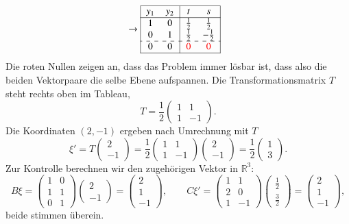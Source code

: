\begin{beispiel}
\begin{align*}
&\rightarrow
\begin{tabular}{|>{$}c<{$}>{$}c<{$}|>{$}c<{$}>{$}c<{$}|}
\hline
y_1&y_2&t&s\\
\hline
1& 0& \frac12& \frac12\\
0& 1& \frac12&-\frac12\\
\hdashline
0& 0&\color{red}0&\color{red}0\\
\hline
\end{tabular}
\end{align*}
Die {\color{red}roten} Nullen zeigen an, dass das Problem immer lösbar
ist, dass also die beiden Vektorpaare die selbe Ebene aufspannen.
Die Transformationsmatrix $T$ steht rechts oben im Tableau,
\[
T=
\frac12\begin{pmatrix} 1&1\\1&-1 \end{pmatrix}.
\]
Die Koordinaten $(2,-1)$ ergeben nach Umrechnung mit $T$
\[
\xi'=
T\begin{pmatrix}2\\-1\end{pmatrix}
=
\frac12\begin{pmatrix} 1&1\\1&-1 \end{pmatrix}
\begin{pmatrix}2\\-1\end{pmatrix}
=\frac12\begin{pmatrix}1\\3\end{pmatrix}.
\]
Zur Kontrolle berechnen wir den zugehörigen Vektor in $\mathbb R^3$:
\[
B\xi=
\begin{pmatrix}
1&0\\
1&1\\
0&1
\end{pmatrix}
\begin{pmatrix}2\\-1\end{pmatrix}
=\begin{pmatrix} 2\\1\\-1 \end{pmatrix}
,\qquad
C \xi'
=
\begin{pmatrix}
1& 1\\
2& 0\\
1&-1
\end{pmatrix}\begin{pmatrix}\frac12\\\frac32\end{pmatrix}
=\begin{pmatrix}2\\1\\-1 \end{pmatrix},
\]
beide stimmen überein.
\end{beispiel}


